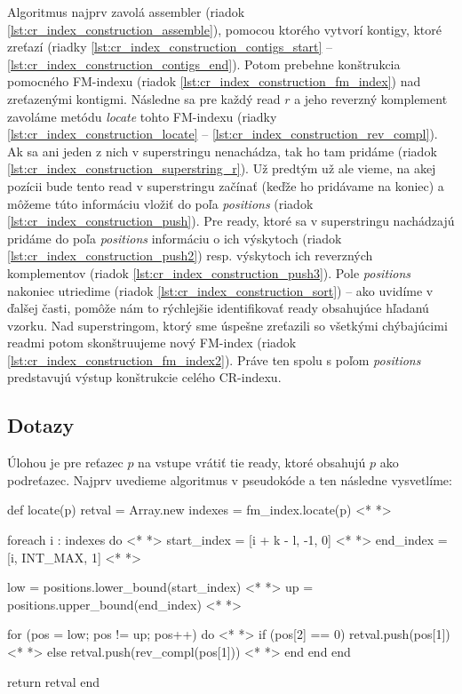 Algoritmus najprv zavolá assembler (riadok \ref{lst:cr_index_construction_assemble}), pomocou ktorého vytvorí kontigy, ktoré zreťazí (riadky \ref{lst:cr_index_construction_contigs_start} -- \ref{lst:cr_index_construction_contigs_end}). Potom prebehne konštrukcia pomocného FM-indexu (riadok \ref{lst:cr_index_construction_fm_index}) nad zreťazenými kontigmi. Následne sa pre každý read $r$ a jeho reverzný komplement zavoláme metódu \emph{locate} tohto FM-indexu (riadky \ref{lst:cr_index_construction_locate} -- \ref{lst:cr_index_construction_rev_compl}). Ak sa ani jeden z nich v superstringu nenachádza, tak ho tam pridáme (riadok \ref{lst:cr_index_construction_superstring_r}). Už predtým už ale vieme, na akej pozícii bude tento read v superstringu začínať (keďže ho pridávame na koniec) a môžeme túto informáciu vložiť do poľa \emph{positions} (riadok \ref{lst:cr_index_construction_push}). Pre ready, ktoré sa v superstringu nachádzajú pridáme do poľa \emph{positions} informáciu o ich výskytoch (riadok \ref{lst:cr_index_construction_push2}) resp. výskytoch ich reverzných komplementov (riadok \ref{lst:cr_index_construction_push3}). Pole \emph{positions} nakoniec utriedime (riadok \ref{lst:cr_index_construction_sort}) -- ako uvidíme v ďalšej časti, pomôže nám to rýchlejšie identifikovať ready obsahujúce hľadanú vzorku. Nad superstringom, ktorý sme úspešne zreťazili so všetkými chýbajúcimi readmi potom skonštruujeme nový FM-index (riadok \ref{lst:cr_index_construction_fm_index2}). Práve ten spolu s poľom \emph{positions} predstavujú výstup konštrukcie celého CR-indexu.

\subsection{Dotazy}
\label{ssec:dotazy}
Úlohou je pre reťazec $p$ na vstupe vrátiť tie ready, ktoré obsahujú $p$ ako podreťazec. Najprv uvedieme algoritmus v pseudokóde a ten následne vysvetlíme:

\bigskip
\begin{pseudocode}[label=lst:cr_index_query,caption={Algoritmus dotazu \emph{locate} CR-indexu nad readmi bez chýb.}]
def locate(p)
  retval = Array.new
  indexes = fm_index.locate(p) <* \label{lst:cr_index_query_locate} *>  
  
  foreach i : indexes do <* \label{lst:cr_index_query_foreach} *>  
    start_index = [i + k - l, -1, 0] <* \label{lst:cr_index_query_start_index} *>  
    end_index = [i, INT_MAX, 1] <* \label{lst:cr_index_query_end_index} *>  
    
    low = positions.lower_bound(start_index) <* \label{lst:cr_index_query_low} *>  
    up = positions.upper_bound(end_index) <* \label{lst:cr_index_query_up} *>  
    
    for (pos = low; pos != up; pos++) do <* \label{lst:cr_index_query_foreach2} *>
      if (pos[2] == 0)
        retval.push(pos[1]) <* \label{lst:cr_index_query_push_read} *>
      else
        retval.push(rev_compl(pos[1])) <* \label{lst:cr_index_query_push_rev_compl} *>
      end
    end
  end
  
  return retval
end
\end{pseudocode}
\bigskip

